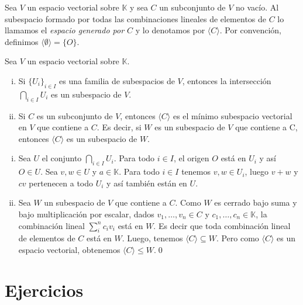 \begin{defn}
Sea $V$ un espacio vectorial sobre $\mathbb{K}$ y sea $C$ un subconjunto de $V$ no vac\'io. Al subespacio formado por todas las combinaciones lineales de elementos de $C$ lo llamamos el \emph{espacio generado por $C$} y lo denotamos por $\langle C \rangle$. Por convenci\'on, definimos $\langle \emptyset\rangle=\{O\}$.
\end{defn}

\begin{prop}\label{propunion}
Sea $V$ un espacio vectorial sobre $\mathbb{K}$.
\begin{enumerate}[(i)]
\item Si $\{U_i\}_{i\in I}$ es una familia de subespacios de $V$, entonces la intersecci\'on $\bigcap_{i \in I} U_i$ es un subespacio de $V$.
\item Si $C$ es un subconjunto de $V$, entonces $\langle C\rangle$ es el m\'inimo subespacio vectorial en $V$ que contiene a $C$. Es decir, si $W$ es un subespacio de $V$ que contiene a C, entonces $\langle C\rangle$ es un subespacio de $W$.
\end{enumerate}
\end{prop}

\dem
\begin{enumerate}[(i)]
\item Sea $U$ el conjunto $\bigcap_{i\in I} U_i$. Para todo $i\in I$, el origen $O$ está en $U_i$ y así $O\in U$. Sea $v,w\in U$ y $a\in \mathbb{K}$. Para todo $i \in I$ tenemos $v,w\in U_i$, luego $v+w$ y $cv$ pertenecen a todo $U_i$ y as\'i tambi\'en est\'an en $U$.
\item Sea  $W$ un subespacio de $V$ que contiene a $C$. Como $W$ es cerrado bajo suma y bajo multiplicaci\'on por escalar, dados $v_1,\ldots,v_n\in C$ y $c_1,\ldots,c_n\in \mathbb{K}$, la combinaci\'on lineal $\sum_i^{n} c_iv_i$ est\'a en $W$. Es decir que toda combinaci\'on lineal de elementos de $C$ est\'a en $W$. Luego, tenemos $\langle C\rangle \subseteq W$. Pero como $\langle C\rangle$ es un espacio vectorial, obtenemos $\langle C\rangle \le W$.\qed
\end{enumerate}

\section*{Ejercicios}

